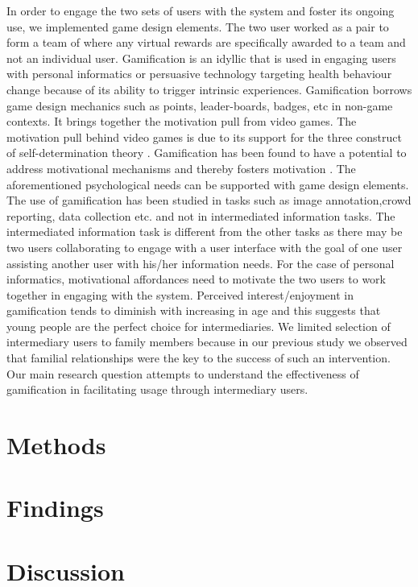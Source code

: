\documentclass{sig-alternate}
\begin{document}
In order to engage the two sets of users with the system and foster its ongoing use, we implemented game design elements. The two user worked as a pair to form a team of where any virtual rewards are specifically awarded to a team and not an individual user. Gamification is an idyllic that is used in engaging users with personal informatics or persuasive technology targeting health behaviour change because of its ability to trigger intrinsic experiences. Gamification borrows game design mechanics such as points, leader-boards, badges, etc in non-game contexts. It brings together the motivation pull from video games. The motivation pull behind video games is due to its support for the three construct of self-determination theory \cite{ryan2006:motivationalpull}. Gamification has been found to have a potential to address motivational mechanisms and thereby fosters motivation \cite{sailer2013:psychological}. The aforementioned psychological needs can be supported with game design elements.\newline
The use of gamification has been studied in tasks such as image annotation\cite{mekler2013:points,mekler2013:disassembling},crowd reporting\cite{crowley2012:gamification}, data collection \cite{cechanowicz2013:effects} etc. and not in intermediated information tasks. The intermediated information task is different from the other tasks as there may be two users collaborating to engage with a user interface with the goal of one user assisting another user with his/her information needs. For the case of personal informatics, motivational affordances need to motivate the two users to work together in engaging with the system. Perceived interest/enjoyment in gamification tends to diminish with increasing in age \cite{v2014motivational} and this suggests that young people are the perfect choice for intermediaries. We limited selection of intermediary users to family members because in our previous study we observed that familial relationships were the key to the success of such an intervention.\newline 
Our main research question attempts to understand the effectiveness of gamification in facilitating usage through intermediary users.
\section{Methods}
\section{Findings}
\section{Discussion}
\end{document}
